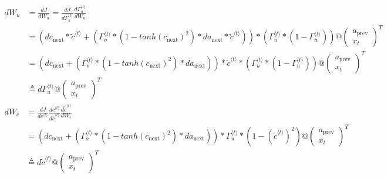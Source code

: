 \documentclass{ctexart}
\begin{document}
\begin{align*}
dW_u &= \frac{dJ}{dW_u}=\frac{dJ}{d\Gamma_u^{\langle t \rangle}}\frac{d\Gamma_u^{\langle t \rangle}}{dW_u}\\&=\left(dc_{\text{next}}*\tilde{c}^{\langle t \rangle}+\left(\Gamma_o^{\langle t\rangle}*(1-tanh(c_{\text{next}})^2)*da_{\text{next}}*\tilde{c}^{\langle t \rangle}\right)\right)*\left(\Gamma_u^{\langle t \rangle}*(1-\Gamma_u^{\langle t \rangle})\right)@\left(
\begin{matrix}
a_{\text{prev}}\\
x_t
\end{matrix}\right)^T\\
&=\left(dc_{\text{next}}+\left(\Gamma_o^{\langle t\rangle}*(1-tanh(c_{\text{next}})^2)*da_{\text{next}}\right)\right)*\tilde{c}^{\langle t \rangle}*\left(\Gamma_u^{\langle t \rangle}*(1-\Gamma_u^{\langle t \rangle})\right)@\left(
\begin{matrix}
a_{\text{prev}}\\
x_t
\end{matrix}\right)^T
\\
&\triangleq{d\Gamma_u^{\langle t \rangle}}@\left(
\begin{matrix}
a_{\text{prev}}\\
x_t
\end{matrix}\right)^T
\end{align*}
\begin{align*}
dW_c &= \frac{dJ}{dc^{\langle t \rangle}}\frac{dc^{\langle t \rangle}}{d\tilde{c}^{\langle t \rangle}}\frac{d\tilde{c}^{\langle t \rangle}}{dW_c}\\
&=\left(dc_{\text{next}}+\left(\Gamma_o^{\langle t\rangle}*(1-tanh(c_{\text{next}})^2)*da_{\text{next}}\right)\right)*\Gamma_u^{\langle t \rangle}*\left(1-(\tilde{c}^{\langle t \rangle})^2\right)@\left(
\begin{matrix}
a_{\text{prev}}\\
x_t
\end{matrix}\right)^T
\\
&\triangleq{d\tilde{c}^{\langle t \rangle}}@\left(
\begin{matrix}
a_{\text{prev}}\\
x_t
\end{matrix}\right)^T
\end{align*}
\end{document}

